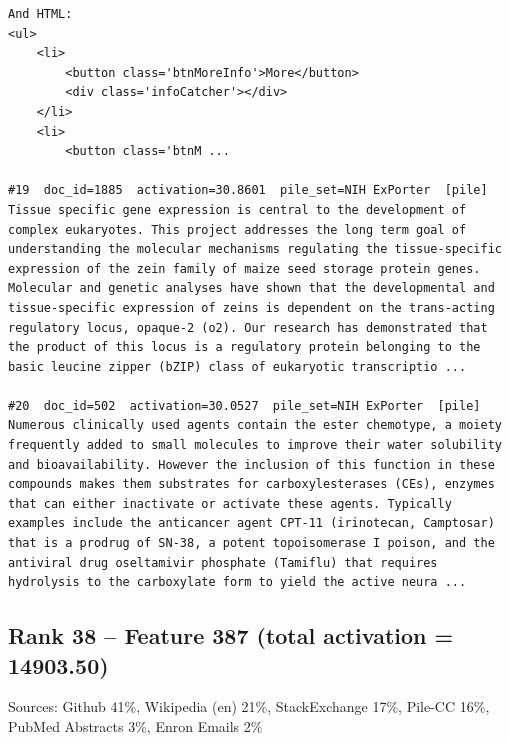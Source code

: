 \begin{verbatim}
And HTML:
<ul>
    <li>
        <button class='btnMoreInfo'>More</button>
        <div class='infoCatcher'></div>
    </li>
    <li>
        <button class='btnM ...

#19  doc_id=1885  activation=30.8601  pile_set=NIH ExPorter  [pile]
Tissue specific gene expression is central to the development of complex eukaryotes. This project addresses the long term goal of understanding the molecular mechanisms regulating the tissue-specific expression of the zein family of maize seed storage protein genes. Molecular and genetic analyses have shown that the developmental and tissue-specific expression of zeins is dependent on the trans-acting regulatory locus, opaque-2 (o2). Our research has demonstrated that the product of this locus is a regulatory protein belonging to the basic leucine zipper (bZIP) class of eukaryotic transcriptio ...

#20  doc_id=502  activation=30.0527  pile_set=NIH ExPorter  [pile]
Numerous clinically used agents contain the ester chemotype, a moiety frequently added to small molecules to improve their water solubility and bioavailability. However the inclusion of this function in these compounds makes them substrates for carboxylesterases (CEs), enzymes that can either inactivate or activate these agents. Typically examples include the anticancer agent CPT-11 (irinotecan, Camptosar) that is a prodrug of SN-38, a potent topoisomerase I poison, and the antiviral drug oseltamivir phosphate (Tamiflu) that requires hydrolysis to the carboxylate form to yield the active neura ...

\end{verbatim}

\subsection*{Rank 38 -- Feature 387 (total activation = 14903.50)}

Sources: Github 41\%, Wikipedia (en) 21\%, StackExchange 17\%, Pile-CC 16\%, PubMed Abstracts 3\%, Enron Emails 2\%

